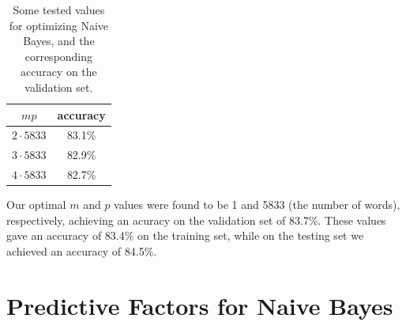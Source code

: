 \documentclass{article}
\renewcommand{\arraystretch}{1.25}
\begin{document}
      \begin{table}[h]
         \centering
         \renewcommand{\arraystretch}{1.5}

         \begin{tabular}{ c|c }
            \hline
            $mp$ & accuracy \\
            \hline \hline
            $2 \cdot 5833$ & 83.1\% \\
            $3 \cdot 5833$ & 82.9\%  \\
            $4 \cdot 5833$ & 82.7\%  \\
            \hline
         \end{tabular}

         \caption{ Some tested values for optimizing Naive Bayes, and the corresponding accuracy on the
               validation set.}
      \end{table}


   Our optimal $m$ and $p$ values were found to be 1 and 5833 (the number of words), respectively, achieving
   an acuracy on the validation set of 83.7\%.
   These values gave an accuracy of 83.4\% on the training set, while on the testing set
   we achieved an accuracy of 84.5\%.


   \section{Predictive Factors for Naive Bayes}
\end{document}
